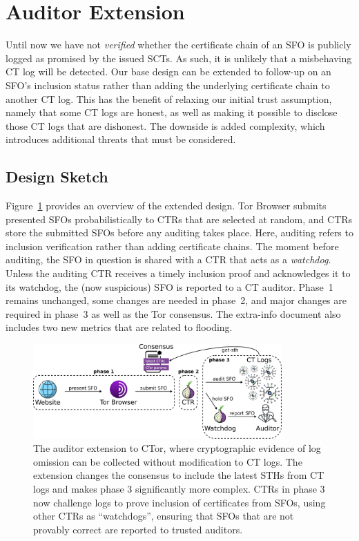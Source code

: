 \section{Auditor Extension} \label{sec:auditor}
Until now we have not \emph{verified} whether the certificate chain of an SFO is
publicly logged as promised by the issued SCTs.  As such, it is unlikely that a
misbehaving CT log will be detected.
Our base design can be extended to follow-up
on an SFO's inclusion status rather than adding the underlying certificate chain
to another CT log.  This has the benefit of relaxing our initial trust
assumption, namely that some CT logs are honest, as well as making it possible
to disclose those CT logs that are dishonest.  The downside is added
complexity, which introduces additional threats that must be considered.

\subsection{Design Sketch} \label{sec:auditor:design}
Figure~\ref{fig:auditor} provides an overview of the extended design.  Tor
Browser submits presented SFOs probabilistically to CTRs that are selected at
random, and CTRs store the submitted SFOs before any auditing takes place.
Here, auditing refers to inclusion verification rather than adding certificate
chains.  The moment before auditing, the SFO in question is shared with a CTR
that acts as a \emph{watchdog}.  Unless the auditing CTR receives a timely
inclusion proof and acknowledges it to its watchdog, the (now suspicious) SFO is
reported to a CT auditor.  Phase~1 remains unchanged, some changes are needed
in phase~2, and major changes are required in phase~3 as well as the Tor
consensus.  The extra-info document also includes two new metrics that are
related to flooding.

\begin{figure}
    \centering
    \includegraphics[width=0.85\textwidth]{img/design-auditor}
	\caption{The auditor extension to CTor, where cryptographic evidence of log
	omission can be collected without modification to CT logs. The extension
	changes the consensus to include the latest STHs from CT logs and makes
	phase 3 significantly more complex. CTRs in phase 3 now challenge logs to
	prove inclusion of certificates from SFOs, using other CTRs as
	``watchdogs'', ensuring that SFOs that are not provably correct are reported
	to trusted auditors.}
	\label{fig:auditor}
\end{figure}

